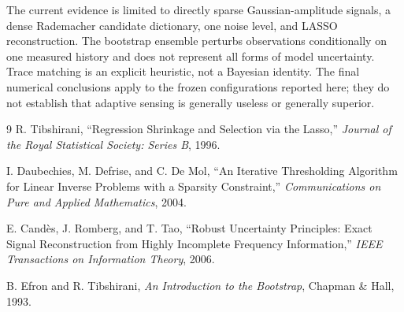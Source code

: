 \documentclass[11pt,a4paper]{article}
\begin{document}
The current evidence is limited to directly sparse Gaussian-amplitude signals, a dense
Rademacher candidate dictionary, one noise level, and LASSO reconstruction.  The bootstrap
ensemble perturbs observations conditionally on one measured history and does not represent
all forms of model uncertainty.  Trace matching is an explicit heuristic, not a Bayesian
identity.  The final numerical conclusions apply to the frozen configurations reported here;
they do not establish that adaptive sensing is generally useless or generally superior.

\small
\begin{thebibliography}{9}
\setlength{\itemsep}{0.15em}
R. Tibshirani, ``Regression Shrinkage and Selection via the Lasso,''
\emph{Journal of the Royal Statistical Society: Series B}, 1996.

I. Daubechies, M. Defrise, and C. De Mol, ``An Iterative Thresholding Algorithm for Linear
Inverse Problems with a Sparsity Constraint,'' \emph{Communications on Pure and Applied
Mathematics}, 2004.

E. Cand\`es, J. Romberg, and T. Tao, ``Robust Uncertainty Principles: Exact Signal
Reconstruction from Highly Incomplete Frequency Information,''
\emph{IEEE Transactions on Information Theory}, 2006.

B. Efron and R. Tibshirani, \emph{An Introduction to the Bootstrap}, Chapman \& Hall, 1993.
\end{thebibliography}
\end{document}
